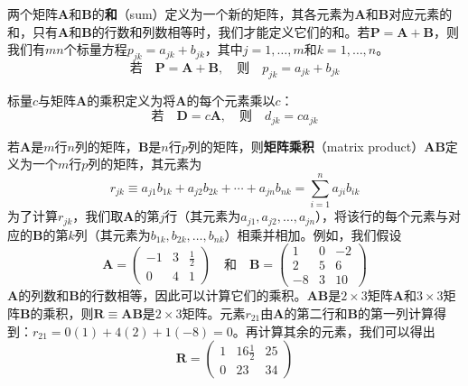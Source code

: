     两个矩阵$\mathbf{A}$和$\mathbf{B}$的\textbf{和}（sum）定义为一个新的矩阵，其各元素为$\mathbf{A}$和$\mathbf{B}$对应元素的和，只有$\mathbf{A}$和$\mathbf{B}$的行数和列数相等时，我们才能定义它们的和。若$\mathbf{P} = \mathbf{A} + \mathbf{B}$，则我们有$mn$个标量方程$p_{jk} = a_{jk} + b_{jk}$，其中$j = 1, \ldots, m$和$k = 1, \ldots, n$。
    \begin{equation}
        \boxed{
            \text{若} \quad \mathbf{P} = \mathbf{A} + \mathbf{B}, \quad \text{则} \quad p_{jk} = a_{jk} + b_{jk}
        }
        \label{eq:7.105}
    \end{equation}

    标量$c$与矩阵$\mathbf{A}$的乘积定义为将$\mathbf{A}$的每个元素乘以$c$：
    \begin{equation}
        \boxed{
            \text{若} \quad \mathbf{D} = c\mathbf{A}, \quad \text{则} \quad d_{jk} = ca_{jk}
        }
        \label{eq:7.106}
    \end{equation}

    若$\mathbf{A}$是$m$行$n$列的矩阵，$\mathbf{B}$是$n$行$p$列的矩阵，则\textbf{矩阵乘积}（matrix product）$\mathbf{A}\mathbf{B}$定义为一个$m$行$p$列的矩阵，其元素为
    \begin{equation}
        \boxed{
            r_{jk} \equiv a_{j1}b_{1k} + a_{j2}b_{2k} + \cdots + a_{jn}b_{nk} = \sum_{i=1}^{n}a_{ji}b_{ik}
        }
        \label{eq:7.107}
    \end{equation}
    为了计算$r_{jk}$，我们取$\mathbf{A}$的第$j$行（其元素为$a_{j1}, a_{j2}, \ldots, a_{jn}$），将该行的每个元素与对应的$\mathbf{B}$的第$k$列（其元素为$b_{1k}, b_{2k}, \ldots, b_{nk}$）相乘并相加。例如，我们假设
    \begin{equation*}
        \mathbf{A} = \begin{pmatrix}
            -1 & 3 & \frac{1}{2} \\
            0 & 4 & 1
        \end{pmatrix}
        \quad \text{和} \quad
        \mathbf{B} = \begin{pmatrix}
            1 & 0 & -2 \\
            2 & 5 & 6 \\
            -8 & 3 & 10
        \end{pmatrix}
    \end{equation*}
    $\mathbf{A}$的列数和$\mathbf{B}$的行数相等，因此可以计算它们的乘积。$\mathbf{A}\mathbf{B}$是$2\times 3$矩阵$\mathbf{A}$和$3\times 3$矩阵$\mathbf{B}$的乘积，则$\mathbf{R} \equiv \mathbf{A}\mathbf{B}$是$2\times 3$矩阵。元素$r_{21}$由$\mathbf{A}$的第二行和$\mathbf{B}$的第一列计算得到：$r_{21} = 0\left(1\right) + 4\left(2\right) + 1\left(-8\right) = 0$。再计算其余的元素，我们可以得出
    \begin{equation*}
        \mathbf{R} = \begin{pmatrix}
            1 & 16\frac{1}{2} & 25 \\
            0 & 23 & 34
        \end{pmatrix}
    \end{equation*}

